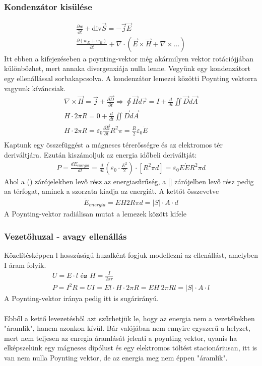 \documentclass{article}
\begin{document}
\subsubsection{Kondenzátor kisülése}
\begin{gather*}
\frac{\partial w}{\partial t} + \mathrm{div} \vec{S} = -\vec{j} \vec{E} \\
\frac{\partial (w_E + w_B)}{\partial t} + \nabla \cdot (\vec{E}\times \vec{H} + \nabla \times \dots)
\end{gather*}
Itt ebben a kifejezéseben a poynting-vektor még akármilyen vektor rotációjjában különbözhet, mert annaka divergenxiája nulla lenne. Vegyünk egy kondenzátort egy ellenállással sorbakapcsolva. A kondenzátor lemezei közötti Poynting vektorra vagyunk kíváncsiak.
\begin{gather*}
\nabla \times \vec{H} = \vec{j} + \frac{\partial \vec{D}}{\partial t} \Rightarrow \oint \vec{H} d\vec{r} = I+\frac{d}{dt} \iint \vec{D} d\vec{A} \\
H \cdot 2\pi R = 0 + \frac{d}{dt} \iint \vec{D} d\vec{A} \\
H \cdot 2\pi R = \varepsilon_0 \frac{\partial \vec{E}}{\partial t} R^2 \pi = \frac{R}{2}\varepsilon_0 \dot{E} \\
\end{gather*}
Kaptunk egy összefüggést a mágneses térerősségre és az elektromos tér deriváltjára. Ezután kiszámoljuk az energia időbeli deriváltját:
\begin{gather*}
P = \frac{dE_{energia}}{dt} = \frac{d}{dt} \left( \varepsilon_0 \cdot \frac{E^2}{2} \right) \cdot \left[ R^2 \pi d \right] = \varepsilon_0 E \dot{E} R^2 \pi d
\end{gather*}
Ahol a () zárójelekben levő rész az energiasűrűség, a [] zárójelben levő rész pedig aa térfogat, aminek a szorzata kiadja az energiát. A kettőt összevetve
\begin{gather*}
\dot{E}_{energia} = EH2R\pi d = |S| \cdot A \cdot d
\end{gather*}
A Poynting-vektor radiálisan mutat a lemezek között kifele
\subsubsection{Vezetőhuzal - avagy ellenállás}
Közelítésképpen l hosszúságú huzalként fogjuk modellezni az  ellenállást, amelyben I áram folyik.
\begin{gather*}
U=E \cdot l \texttt{   és   }  H = \frac{I}{2\pi r} \\
P=I^2 R =UI = El \cdot H \cdot 2\pi R = EH \ 2\pi R l = |S| \cdot A \cdot l
\end{gather*}
A Poynting-vektor iránya pedig itt is sugárirányú. 
\\
\\
Ebből a kettő levezetésből azt szűrhetjük le, hogy az energia nem a vezetékekben "áramlik", hanem azonkon kívül. Bár valójában nem ennyire egyszerű a helyzet, mert nem teljesen az enregia áramlását jelenti a poynting vektor, uyanis ha elképszelünk egy mágneses dipólust és egy elektromos töltést stacionáriusan, itt is van nem nulla Poynting vektor, de az energia meg nem éppen "áramlik".
\end{document}
